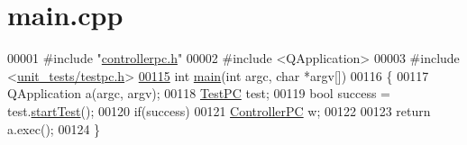 \hypertarget{main_8cpp_source}{}\section{main.\+cpp}
\label{main_8cpp_source}

\begin{DoxyCode}
00001 \textcolor{preprocessor}{#include "\mbox{\hyperlink{controllerpc_8h}{controllerpc.h}}"}
00002 \textcolor{preprocessor}{#include <QApplication>}
00003 \textcolor{preprocessor}{#include <\mbox{\hyperlink{testpc_8h}{unit\_tests/testpc.h}}>}
\mbox{\hyperlink{main_8cpp_a0ddf1224851353fc92bfbff6f499fa97}{00115}} \textcolor{keywordtype}{int} \mbox{\hyperlink{main_8cpp_a0ddf1224851353fc92bfbff6f499fa97}{main}}(\textcolor{keywordtype}{int} argc, \textcolor{keywordtype}{char} *argv[])
00116 \{
00117     QApplication a(argc, argv);
00118     \mbox{\hyperlink{class_test_p_c}{TestPC}} test;
00119     \textcolor{keywordtype}{bool} success = test.\mbox{\hyperlink{class_test_p_c_ad0d724439a65d183d3d336b667cb867b}{startTest}}();
00120     \textcolor{keywordflow}{if}(success)
00121         \mbox{\hyperlink{class_controller_p_c}{ControllerPC}} w;
00122 
00123     \textcolor{keywordflow}{return} a.exec();
00124 \}
\end{DoxyCode}
